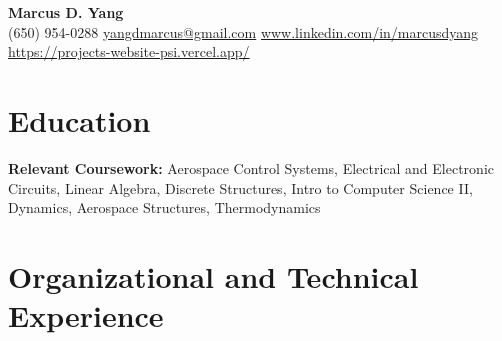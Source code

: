 \newcommand{\entrygap}{\vspace{2pt}}



\begin{center}
  {\fontsize{17}{20}\selectfont\bfseries Marcus D. Yang}\\[2pt]
  {\footnotesize (650) 954-0288 \textbar{} \href{mailto:yangdmarcus@gmail.com}{yangdmarcus@gmail.com} \textbar{} \href{https://www.linkedin.com/in/marcusdyang}{www.linkedin.com/in/marcusdyang} \textbar{} \href{https://projects-website-psi.vercel.app/}{https://projects-website-psi.vercel.app/}}
\end{center}

\section{Education}
\textbf{Relevant Coursework:} Aerospace Control Systems, Electrical and Electronic Circuits, Linear Algebra, Discrete Structures, Intro to Computer Science II, Dynamics, Aerospace Structures, Thermodynamics

\section{Organizational and Technical Experience}

